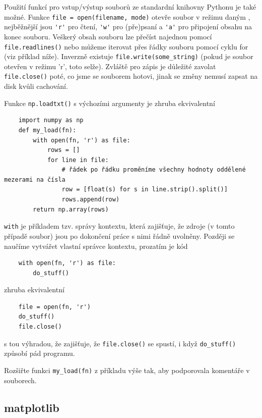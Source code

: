Použití funkcí pro vstup/výstup souborů ze standardní knihovny Pythonu je také možné. Funkce \lstinline{file = open(filename, mode)} otevře soubor v režimu daným , nejběžnější jsou \lstinline{'r'} pro čtení, \lstinline{'w'} pro (pře)psaní a \lstinline{'a'} pro připojení obsahu na konec souboru. Veškerý obsah souboru lze přečíst najednou pomocí \lstinline{file.readlines()} nebo můžeme iterovat přes řádky souboru pomocí cyklu for (viz příklad níže). Inverzně existuje \lstinline{file.write(some_string)} (pokud je soubor otevřen v režimu 'r', toto selže). Zvláště pro zápis je důležité zavolat \lstinline{file.close()} poté, co jsme se souborem hotovi, jinak se změny nemusí zapsat na disk kvůli cachování.

Funkce \lstinline{np.loadtxt()} s výchozími argumenty je zhruba ekvivalentní
\begin{lstlisting}
    import numpy as np
    def my_load(fn):
        with open(fn, 'r') as file:
            rows = []
            for line in file:
                # řádek po řádku proměníme všechny hodnoty oddělené mezerami na čísla
                row = [float(s) for s in line.strip().split()]
                rows.append(row)
        return np.array(rows)
\end{lstlisting}
\begin{syntax}
\lstinline{with} je příkladem tzv. správy kontextu, která zajišťuje, že zdroje (v tomto případě soubor) jsou po dokončení práce s nimi řádně uvolněny. Později se naučíme vytvářet vlastní správce kontextu, prozatím je kód
\begin{lstlisting}
    with open(fn, 'r') as file:
        do_stuff()
\end{lstlisting}
    zhruba ekvivalentní
\begin{lstlisting}
    file = open(fn, 'r')
    do_stuff()
    file.close()
\end{lstlisting}
s tou výhradou, že  zajišťuje, že \lstinline{file.close()} se spustí, i když \lstinline{do_stuff()} způsobí pád programu.
\end{syntax}

\begin{exercise}
    Rozšiřte funkci \lstinline{my_load(fn)} z příkladu výše tak, aby podporovala komentáře v souborech.
\end{exercise}

\subsection{matplotlib}

